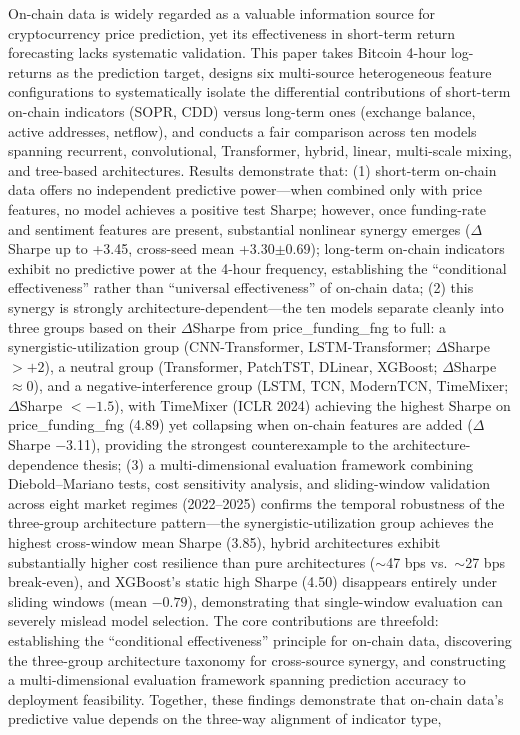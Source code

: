 \documentclass[12pt,a4paper]{ctexart}
\begin{document}
\begin{center}
{}
\end{center}

On-chain data is widely regarded as a valuable information source for cryptocurrency price prediction, yet its effectiveness in short-term return forecasting lacks systematic validation. This paper takes Bitcoin 4-hour log-returns as the prediction target, designs six multi-source heterogeneous feature configurations to systematically isolate the differential contributions of short-term on-chain indicators (SOPR, CDD) versus long-term ones (exchange balance, active addresses, netflow), and conducts a fair comparison across ten models spanning recurrent, convolutional, Transformer, hybrid, linear, multi-scale mixing, and tree-based architectures. Results demonstrate that: (1) short-term on-chain data offers no independent predictive power---when combined only with price features, no model achieves a positive test Sharpe; however, once funding-rate and sentiment features are present, substantial nonlinear synergy emerges ($\Delta$Sharpe up to +3.45, cross-seed mean +3.30$\pm$0.69); long-term on-chain indicators exhibit no predictive power at the 4-hour frequency, establishing the ``conditional effectiveness'' rather than ``universal effectiveness'' of on-chain data; (2) this synergy is strongly architecture-dependent---the ten models separate cleanly into three groups based on their $\Delta$Sharpe from price\_funding\_fng to full: a synergistic-utilization group (CNN-Transformer, LSTM-Transformer; $\Delta$Sharpe $> +2$), a neutral group (Transformer, PatchTST, DLinear, XGBoost; $\Delta$Sharpe $\approx 0$), and a negative-interference group (LSTM, TCN, ModernTCN, TimeMixer; $\Delta$Sharpe $< -1.5$), with TimeMixer (ICLR 2024) achieving the highest Sharpe on price\_funding\_fng (4.89) yet collapsing when on-chain features are added ($\Delta$Sharpe $-$3.11), providing the strongest counterexample to the architecture-dependence thesis; (3) a multi-dimensional evaluation framework combining Diebold--Mariano tests, cost sensitivity analysis, and sliding-window validation across eight market regimes (2022--2025) confirms the temporal robustness of the three-group architecture pattern---the synergistic-utilization group achieves the highest cross-window mean Sharpe (3.85), hybrid architectures exhibit substantially higher cost resilience than pure architectures ($\sim$47 bps vs.\ $\sim$27 bps break-even), and XGBoost's static high Sharpe (4.50) disappears entirely under sliding windows (mean $-0.79$), demonstrating that single-window evaluation can severely mislead model selection. The core contributions are threefold: establishing the ``conditional effectiveness'' principle for on-chain data, discovering the three-group architecture taxonomy for cross-source synergy, and constructing a multi-dimensional evaluation framework spanning prediction accuracy to deployment feasibility. Together, these findings demonstrate that on-chain data's predictive value depends on the three-way alignment of indicator type, 
\end{document}
